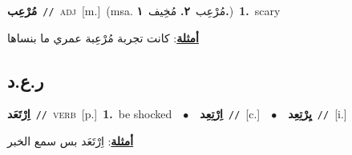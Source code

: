 \documentclass[10pt,a4paper,twoside]{article} %
\begin{document}
\begin{multicols}{2}
{\setlength\topsep{0pt}\textbf{\foreignlanguage{arabic}{مُرْعِب}}\ {\color{gray}\texttt{//}\color{black}}\ \textsc{adj}\ [m.]\ \color{gray}(msa. \foreignlanguage{arabic}{مُرْعِب}~\foreignlanguage{arabic}{\textbf{٢.}}  \foreignlanguage{arabic}{مُخِيف}~\foreignlanguage{arabic}{\textbf{١.}})\color{black}\ \textbf{1.}~scary\  \begin{flushright}\color{gray}\foreignlanguage{arabic}{\textbf{\underline{\foreignlanguage{arabic}{أمثلة}}}: كانت تجربة مُرْعِبة عمري ما بنساها}\end{flushright}\color{black}} \vspace{2mm}

\vspace{-3mm}
\subsection*{\color{blue}\foreignlanguage{arabic}{ر.ع.د}\color{blue}{}} 

{\setlength\topsep{0pt}\textbf{\foreignlanguage{arabic}{اِرْتَعَد}}\ {\color{gray}\texttt{//}\color{black}}\ \textsc{verb}\ [p.]\ \textbf{1.}~be shocked\ \ $\bullet$\ \ \setlength\topsep{0pt}\textbf{\foreignlanguage{arabic}{اِرْتِعِد}}\ {\color{gray}\texttt{//}\color{black}}\ [c.]\ \ $\bullet$\ \ \setlength\topsep{0pt}\textbf{\foreignlanguage{arabic}{يِرْتِعِد}}\ {\color{gray}\texttt{//}\color{black}}\ [i.]\  \begin{flushright}\color{gray}\foreignlanguage{arabic}{\textbf{\underline{\foreignlanguage{arabic}{أمثلة}}}: اِرْتَعَد بس سمع الخبر}\end{flushright}\color{black}} \vspace{2mm}


\end{multicols}
\end{document}
